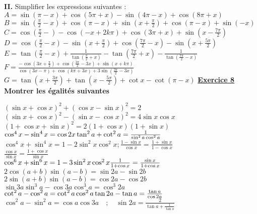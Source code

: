 \documentclass[12pt,a4paper]{article}
\begin{document}
\begin{multicols}{2}
\textbf{II.} Simplifier les expressions suivantes :\\

\(
A = \sin(\pi - x) + \cos(5\pi + x) - \sin(4\pi - x) + \cos(8\pi + x)
\)\\
\(
B = \sin\left( \frac{\pi}{2} - x \right) + \cos(\pi - x) + \sin\left( x + \frac{\pi}{2} \right) + \cos(\pi - x) + \sin(-x)
\)\\
\(
C = \cos\left( \frac{\pi}{2} - \right) - \cos(-x + 2k\pi) + \cos(3\pi + x) + \sin\left( x - \frac{7\pi}{2} \right)
\)\\
\(
D = \cos\left( \frac{\pi}{2} - x \right) - \sin\left( x + \frac{\pi}{2} \right) + \cos\left( \frac{7\pi}{2} - x \right) - \sin\left( x + \frac{5\pi}{2} \right)
\)\\
\(
E = \tan\left( \frac{\pi}{2} - x \right) + \frac{1}{\tan\left( \frac{\pi}{2} + x \right)} - \tan\left( \frac{7\pi}{2} + x \right) - \frac{1}{\tan\left( \frac{7\pi}{2} - x \right)}
\)\\
\(
F = \frac{-\cos\left( 3x + \frac{\pi}{2} \right) + \cos\left( \frac{3\pi}{2} - 3x \right) + \sin(x + k\pi)}{
\cos(3x - \pi) + \cos(k\pi + 3x) + 3\sin\left( \frac{3\pi}{2} - 3x \right)}
\)\\
\(
G = \tan\left( x + \frac{3\pi}{2} \right) + \tan\left( x - \frac{5\pi}{2} \right) + \cot x - \cot(\pi - x)
\)
\textbf{\underline{Exercice 8}}
\textbf{ Montrer les égalités suivantes} 

\( (\sin x + \cos x)^2 + (\cos x - \sin x)^2 = 2 \)\\
\( (\sin x + \cos x)^2 - (\sin x - \cos x)^2 = 4 \sin x \cos x \)\\
\( (1 + \cos x + \sin x)^2 = 2(1 + \cos x)(1 + \sin x) \)\\
\( \cos^4 x - \sin^4 x = \cos 2x\\
\tan^2 a + \cot^2 a = \frac{1}{\sin^2 a \cos^2 a} \)\\
\( \cos^4 x + \sin^4 x = 1 - 2 \sin^2 x \cos^2 x ; \frac{1 - \sin x}{\cos x} = \frac{1 + \sin x}{1 - \cos x} \)\\
\( \frac{\cos x}{\sin x} = \frac{1 + \cos x}{\sin x} \)\\
\( \cos^6 x + \sin^6 x = 1 - 3 \sin^2 x \cos^2 x \\ \frac{1}{1 + \cos x} = \frac{\sin x}{1 + \cos x} \)\\
\( 2\cos(a + b)\sin(a - b) = \sin 2a - \sin 2b \)\\
\( 2\sin(a + b)\sin(a - b) = \cos 2a - \cos 2b \)\\
\( \sin 3a \sin^3 a - \cos 3a \cos^3 a = \cos^3 2a \)\\
\( \cot^2 a - \cos^2 a = \cot^2 a \cos^2 a \\ \tan 2a - \tan a = \frac{\tan a}{\cos 2a} \)\\
\( \cos^2 a - \sin^2 a = \cos a \cos 3a \quad ; \quad \sin 2a = \frac{2}{\tan a + \frac{1}{\tan a}} \)


\end{multicols}
\end{document}
